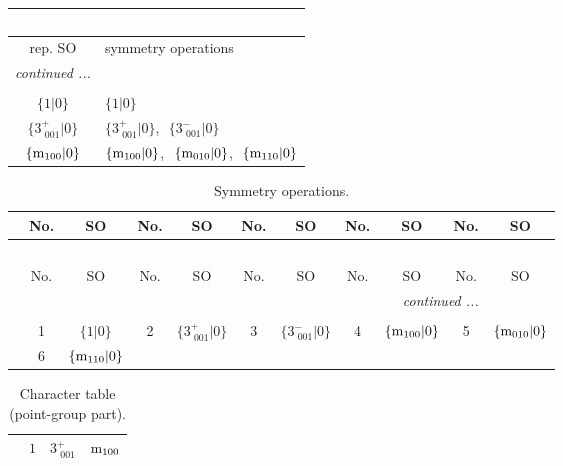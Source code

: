\documentclass[fleqn,10pt,landscape]{article}
\begin{document}
\begin{itemize}
\begin{center}
\begin{longtable}{c|l}
\multicolumn{1}{l}{\tablename\ \thetable{}} \\
 \hline \hline
rep. SO & symmetry operations \\ \hline \endhead

 \hline \hline
\multicolumn{1}{r}{\footnotesize\it continued ...} \\ \endfoot

 \hline \hline
\multicolumn{1}{r}{} \\ \endlastfoot

$\{1|0\}$ & $\{1|0\}$ \\ \hline
$\{3^{+}_{\,\,001}|0\}$ & $\{3^{+}_{\,\,001}|0\}$,\,\, $\{3^{-}_{\,\,001}|0\}$ \\ \hline
$\{{\rm m}_{100}|0\}$ & $\{{\rm m}_{100}|0\}$,\,\, $\{{\rm m}_{010}|0\}$,\,\, $\{{\rm m}_{110}|0\}$ \\
\end{longtable}
\end{center}
\begin{center}
\renewcommand{\arraystretch}{1.3}
\begin{longtable}{c|cc|cc|cc|cc|cc}
\caption{Symmetry operations.}
 \\
 \hline \hline
 & No. & SO & No. & SO & No. & SO & No. & SO & No. & SO \\ \hline \endfirsthead

\multicolumn{10}{l}{\tablename\ \thetable{}} \\
 \hline \hline
 & No. & SO & No. & SO & No. & SO & No. & SO & No. & SO \\ \hline \endhead

 \hline \hline
\multicolumn{10}{r}{\footnotesize\it continued ...} \\ \endfoot

 \hline \hline
\multicolumn{10}{r}{} \\ \endlastfoot

 & 1 & $\{1|0\}$ & 2 & $\{3^{+}_{\,\,001}|0\}$ & 3 & $\{3^{-}_{\,\,001}|0\}$ & 4 & $\{{\rm m}_{100}|0\}$ & 5 & $\{{\rm m}_{010}|0\}$ \\
& 6 & $\{{\rm m}_{110}|0\}$ &  &  &  &  &  &  &  &  \\
\end{longtable}
\end{center}
\begin{center}
\renewcommand{\arraystretch}{1.0}
\begin{longtable}{c|rrr}
\caption{Character table (point-group part).}
 \\
 \hline \hline
 & $ 1 $ & $ 3^{+}_{\,\,001} $ & $ {\rm m}_{100} $ \\ \hline \endfirsthead


\end{longtable}
\end{center}
\end{itemize}
\end{document}
